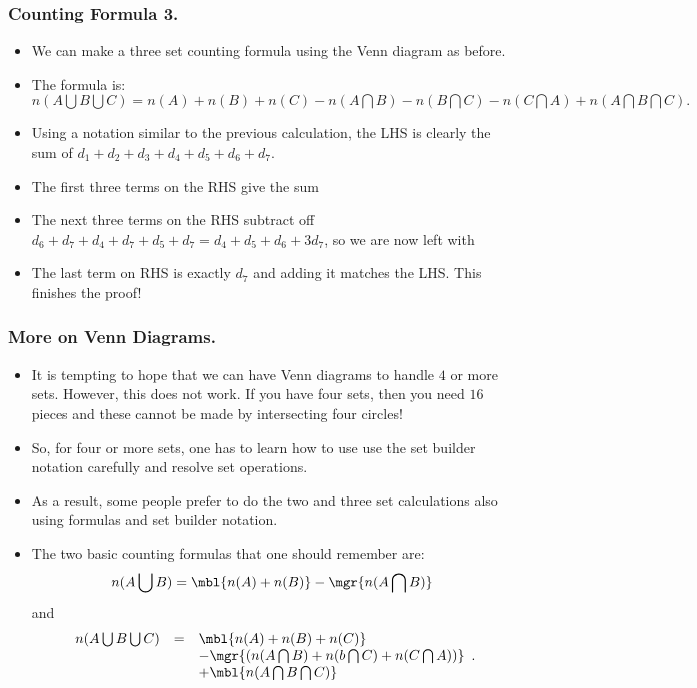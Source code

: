 %


\begin{frame}%
  \frametitle{Counting Formula 3.}
  \begin{itemize}%

\item
We can make a three set counting formula using the Venn diagram as
before.

\item The formula is:
$n(A \bigcup B \bigcup C) = n(A)+n(B) + n(C) -n(A\bigcap B)-n(B\bigcap
C)-n(C\bigcap A) + n(A\bigcap B \bigcap C).$

\item Using a notation similar to the previous calculation, the LHS is
clearly the sum of $d_1+d_2+d_3+d_4+d_5+d_6+d_7$.
\item The first three terms on the RHS give the  sum
\item The next three terms on the RHS subtract off
$d_6+d_7+d_4+d_7+d_5+d_7 =d_4+d_5+d_6+3d_7 $, so we are now left with
\item The last term on RHS is exactly $d_7$ and adding it matches the
LHS. This finishes the proof!

\end{itemize}
\end{frame}
%

\begin{frame}%
  \frametitle{More on Venn Diagrams.}
  \begin{itemize}%
\item
It is tempting to hope that we can have Venn diagrams to handle $4$ or
more sets. However, this does not work. If you have four sets, then you
need $16$ pieces  and these cannot be made by intersecting four circles!

\item So, for four or more sets, one has to learn how to use use the set
builder notation carefully and resolve set operations.

\item As a result, some people prefer to do the two and three set
calculations also using formulas and set builder notation.

\item The two basic counting formulas that one should remember are:
$$n(A\bigcup B) = \mbl{n(A) + n(B)} -\mgr{ n(A\bigcap B)}$$
and
$$
\begin{array}{lcl}
n(A \bigcup B \bigcup C) & = & \mbl{n(A)+n(B) + n(C)} \\
& & -\mgr{(n(A\bigcap B)+n(b\bigcap C)+n(C\bigcap A))}\\
& &  + \mbl{n(A\bigcap B \bigcap C)}
\end{array}
.$$


\end{itemize}
\end{frame}

